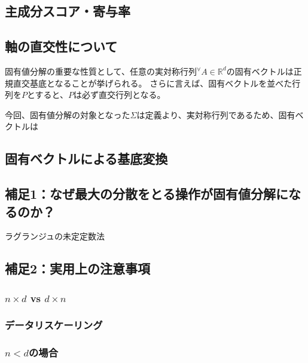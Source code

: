 \documentclass[10pt]{ujarticle}
\begin{document}
\subsection{主成分スコア・寄与率}
\subsection{軸の直交性について}
固有値分解の重要な性質として、任意の実対称行列$^\forall A\in\mathbb{R}^d$の固有ベクトルは正規直交基底となることが挙げられる。
さらに言えば、固有ベクトルを並べた行列を$P$とすると、$P$は必ず直交行列となる。

今回、固有値分解の対象となった$\Sigma$は定義より、実対称行列であるため、固有ベクトルは
\subsection{固有ベクトルによる基底変換}
\subsection{補足1：なぜ最大の分散をとる操作が固有値分解になるのか？}
ラグランジュの未定定数法
\subsection{補足2：実用上の注意事項}
\subsubsection{$n\times d$ vs $d\times n$}
\subsubsection{データリスケーリング}
\subsubsection{$n<d$の場合}
\end{document}
